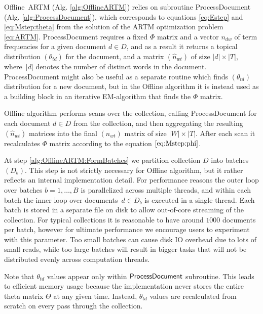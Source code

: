 \documentclass[russian,english]{llncs}
\newcommand{\kw}[1]{\mbox{\textsf{#1}}}
\begin{document}
\kw{Offline ARTM} (Alg. \ref{alg:OfflineARTM}) relies on subroutine
\kw{ProcessDocument} (Alg. \ref{alg:ProcessDocument}),
which corresponds to equations \eqref{eq:Estep} and \eqref{eq:Mstep:theta}
from the solution of the ARTM optimization problem \eqref{eq:ARTM}.
\kw{ProcessDocument} requires a fixed $\Phi$ matrix
and a vector $n_{dw}$ of term frequencies for a given document $d \in D$,
and as a result it returns a topical distribution $(\theta_{td})$ for the document,
and a matrix $(\hat n_{wt})$ of size $|d| \times |T|$,
where~$|d|$ denotes the number of distinct words in the document.
\kw{ProcessDocument} might also be useful as a separate routine which finds $(\theta_{td})$ distribution for a new document,
but in the \kw{Offline} algorithm it is instead used as a building block in an iterative EM-algorithm that finds the $\Phi$ matrix.

\kw{Offline} algorithm performs scans over the collection, calling \kw{ProcessDocument}
for each document $d \in D$ from the collection,
and then aggregating the resulting~$(\hat n_{wt})$ matrices into the final $(n_{wt})$ matrix of size $|W| \times |T|$.
After each scan it recalculates $\Phi$ matrix according to the equation $\eqref{eq:Mstep:phi}$.


At step \ref{alg:OfflineARTM:FormBatches} we partition collection $D$ into batches $(D_b)$.
This step is not strictly necessary for \kw{Offline} algorithm,
but it rather reflects an internal implementation detail.
For performance reasons the outer loop over batches $b = 1, \dots, B$ is parallelized across multiple threads,
and within each batch the inner loop over documents~$d \in D_b$
is executed in a single thread.
Each batch is stored in a separate file on disk to allow out-of-core streaming of the collection.
For typical collections it is reasonable to have around $1000$ documents per batch,
however for ultimate performance we encourage users to experiment with this parameter.
Too small batches can cause disk IO overhead due to lots of small reads,
while too large batches will result in bigger tasks that will not be distributed evenly across computation threads.

Note that $\theta_{td}$ values appear only within $\kw{ProcessDocument}$ subroutine.
This leads to efficient memory usage because the implementation never stores the entire theta matrix $\Theta$ at any given time.
Instead, $\theta_{td}$ values are recalculated from scratch on every pass through the collection.
\end{document}

